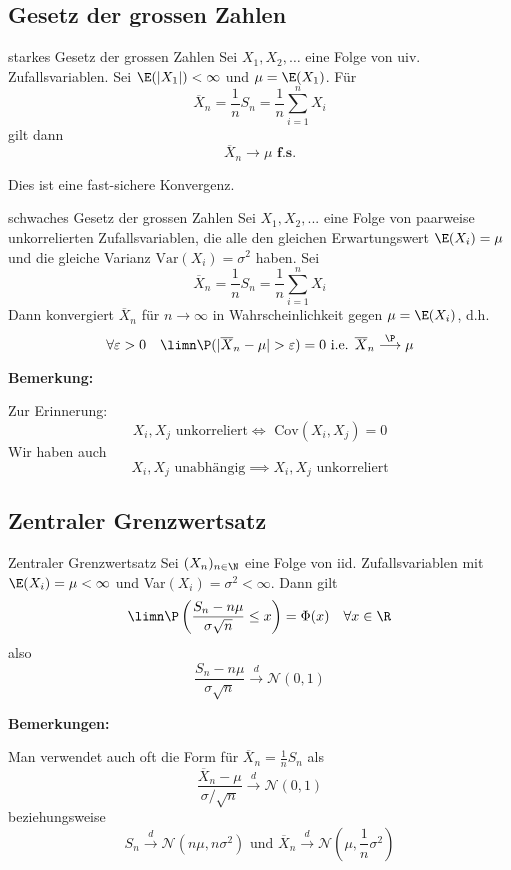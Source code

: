\subsection{Gesetz der grossen Zahlen}
\begin{mainbox}{starkes Gesetz der grossen Zahlen}
    Sei $X_1, X_2, \ldots$ eine Folge von uiv. Zufallsvariablen. Sei $\E(|X_1|)<\infty$ und $\mu = \E(X_1)$. Für
    $$\overline{X}_n = \frac{1}{n}S_n = \frac{1}{n}\sum_{i = 1}^{n}X_i$$
    gilt dann
    $$\overline{X}_n \longrightarrow \mu \textbf{ f.s.}$$
\end{mainbox}
Dies ist eine fast-sichere Konvergenz.
\begin{mainbox}{schwaches Gesetz der grossen Zahlen}
    Sei $X_1, X_2, ...$ eine Folge von paarweise unkorrelierten Zufallsvariablen, die alle den gleichen Erwartungswert $\E(X_i) = \mu$ und die gleiche Varianz $\text{Var}(X_i) = \sigma^2$ haben.
    Sei 
    $$\overline{X}_n = \frac{1}{n}S_n = \frac{1}{n}\sum_{i = 1}^{n}X_i$$
    Dann konvergiert $\overline{X}_n$ für $n \to \infty$ in Wahrscheinlichkeit gegen $\mu = \E(X_i)$, d.h.
    $$\forall \varepsilon > 0 \quad \limn \P(|\overline{X}_n - \mu| > \varepsilon) = 0 \text{ i.e. } \overline{X}_n \overset{\P}{\longrightarrow} \mu$$
\end{mainbox}
\textbf{Bemerkung: }

Zur Erinnerung: 
$$X_i, X_j \text{ unkorreliert} \iff \text{ Cov}(X_i, X_j) = 0$$
Wir haben auch 
$$X_i, X_j \text{ unabhängig} \implies X_i, X_j \text{ unkorreliert}$$

\subsection{Zentraler Grenzwertsatz}
\begin{mainbox}{Zentraler Grenzwertsatz}
    Sei $(X_n)_{n\in \N}$ eine Folge von iid. Zufallsvariablen mit $\E(X_i) = \mu < \infty$ und Var$(X_i) = \sigma^2 < \infty$.
    Dann gilt 
    $$\limn \P\left(\frac{S_n - n \mu}{\sigma \sqrt{n}} \leq x\right) = \Phi(x) \quad \forall x \in \R$$
    also
    $$\frac{S_n - n \mu}{\sigma \sqrt{n}} \overset{d}{\longrightarrow} \mathcal{N}(0,1)$$
\end{mainbox}
\textbf{Bemerkungen: }

Man verwendet auch oft die Form für $\overline{X}_n = \frac{1}{n}S_n$ als
$$\frac{\overline{X}_n - \mu}{\sigma / \sqrt{n}} \overset{d}{\longrightarrow} \mathcal{N}(0,1)$$
beziehungsweise
$$S_n \overset{d}{\longrightarrow} \mathcal{N}(n\mu, n \sigma^2) \text{ und } \overline{X}_n \overset{d}{\longrightarrow} \mathcal{N}\left(\mu, \frac{1}{n}\sigma^2\right)$$
